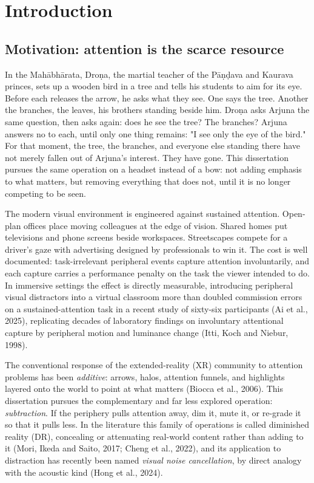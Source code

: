 \chapter{Introduction}

\section{Motivation: attention is the scarce resource}
In the Mahābhārata, Droṇa, the martial teacher of the Pāṇḍava and Kaurava princes, sets up a wooden 
bird in a tree and tells his students to aim for its eye. Before each releases the arrow, he asks what 
they see. One says the tree. Another the branches, the leaves, his brothers standing beside him. 
Droṇa asks Arjuna the same question, then asks again: does he see the tree? The branches? Arjuna answers
no to each, until only one thing remains: "I see only the eye of the bird." For that moment, the tree,
the branches, and everyone else standing there have not merely fallen out of Arjuna's interest. They have gone.
This dissertation pursues the same operation on a headset instead of a bow: not adding emphasis to what matters,
 but removing everything that does not, until it is no longer competing to be seen.

The modern visual environment is engineered against sustained attention. Open-plan offices place
moving colleagues at the edge of vision. Shared homes put televisions and phone screens beside
workspaces. Streetscapes compete for a driver's gaze with advertising designed by professionals to
win it. The cost is well documented: task-irrelevant peripheral events capture attention
involuntarily, and each capture carries a performance penalty on the task the viewer intended to do.
In immersive settings the effect is directly measurable, introducing peripheral visual distractors
into a virtual classroom more than doubled commission errors on a sustained-attention task in a
recent study of sixty-six participants (Ai et al., 2025), replicating decades
of laboratory findings on involuntary attentional capture by peripheral motion and luminance change
(Itti, Koch and Niebur, 1998).

The conventional response of the extended-reality (XR) community to attention problems has been
\textit{additive}: arrows, halos, attention funnels, and highlights layered onto the world to point at what
matters (Biocca et al., 2006). This dissertation pursues the complementary and far less explored
operation: \textit{subtraction}. If the periphery pulls attention away, dim it, mute it, or re-grade it so
that it pulls less. In the literature this family of operations is called diminished reality (DR), 
concealing or attenuating real-world content rather than adding to it (Mori, Ikeda and Saito, 2017;
Cheng et al., 2022),  and its application to distraction has recently been named \textit{visual noise
cancellation}, by direct analogy with the acoustic kind (Hong et al., 2024).

